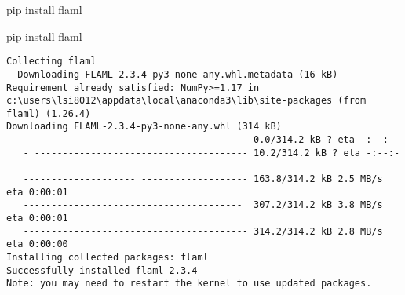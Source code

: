 \documentclass[
  letterpaper,
  DIV=11,
  numbers=noendperiod]{scrreprt}
\newenvironment{Shaded}{\begin{snugshade}}{\end{snugshade}}
\newcommand{\NormalTok}[1]{\textcolor[rgb]{0.00,0.23,0.31}{#1}}
\begin{document}
\begin{Shaded}
\begin{Highlighting}[]
\NormalTok{pip install flaml}
\end{Highlighting}
\end{Shaded}

\begin{Shaded}
\begin{Highlighting}[]
\NormalTok{pip install flaml}
\end{Highlighting}
\end{Shaded}

\begin{verbatim}
Collecting flaml
  Downloading FLAML-2.3.4-py3-none-any.whl.metadata (16 kB)
Requirement already satisfied: NumPy>=1.17 in c:\users\lsi8012\appdata\local\anaconda3\lib\site-packages (from flaml) (1.26.4)
Downloading FLAML-2.3.4-py3-none-any.whl (314 kB)
   ---------------------------------------- 0.0/314.2 kB ? eta -:--:--
   - -------------------------------------- 10.2/314.2 kB ? eta -:--:--
   -------------------- ------------------- 163.8/314.2 kB 2.5 MB/s eta 0:00:01
   ---------------------------------------  307.2/314.2 kB 3.8 MB/s eta 0:00:01
   ---------------------------------------- 314.2/314.2 kB 2.8 MB/s eta 0:00:00
Installing collected packages: flaml
Successfully installed flaml-2.3.4
Note: you may need to restart the kernel to use updated packages.
\end{verbatim}
\end{document}

